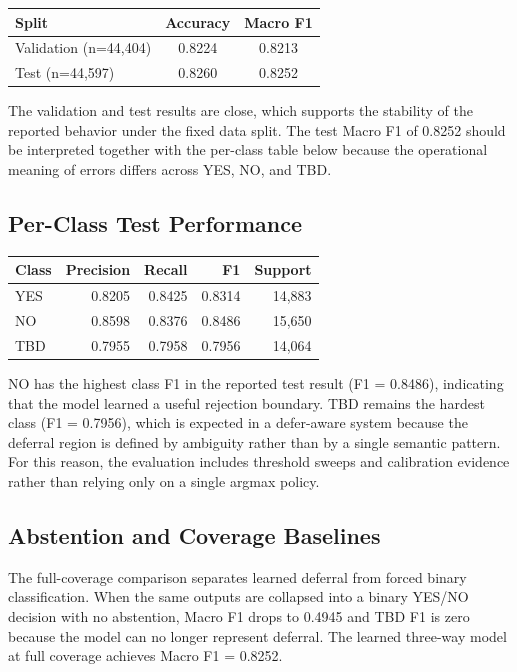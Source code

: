 \documentclass[11pt]{article}
\begin{document}
\begin{center}
\begin{tabular}{lcc}
\toprule
Split & Accuracy & Macro F1 \\
\midrule
Validation (n=44,404) & 0.8224 & 0.8213 \\
Test (n=44,597) & 0.8260 & 0.8252 \\
\bottomrule
\end{tabular}
\end{center}

The validation and test results are close, which supports the stability of the reported behavior under the fixed data split. The test Macro F1 of 0.8252 should be interpreted together with the per-class table below because the operational meaning of errors differs across YES, NO, and TBD.

\subsection{Per-Class Test Performance}

\begin{center}
\begin{tabular}{lrrrr}
\toprule
Class & Precision & Recall & F1 & Support \\
\midrule
YES & 0.8205 & 0.8425 & 0.8314 & 14,883 \\
NO & 0.8598 & 0.8376 & 0.8486 & 15,650 \\
TBD & 0.7955 & 0.7958 & 0.7956 & 14,064 \\
\bottomrule
\end{tabular}
\end{center}

NO has the highest class F1 in the reported test result (F1 = 0.8486), indicating that the model learned a useful rejection boundary. TBD remains the hardest class (F1 = 0.7956), which is expected in a defer-aware system because the deferral region is defined by ambiguity rather than by a single semantic pattern. For this reason, the evaluation includes threshold sweeps and calibration evidence rather than relying only on a single argmax policy.

\subsection{Abstention and Coverage Baselines}

The full-coverage comparison separates learned deferral from forced binary classification. When the same outputs are collapsed into a binary YES/NO decision with no abstention, Macro F1 drops to 0.4945 and TBD F1 is zero because the model can no longer represent deferral. The learned three-way model at full coverage achieves Macro F1 = 0.8252.
\end{document}
